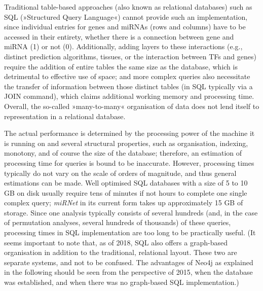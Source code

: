 Traditional table-based approaches (also known as relational databases) such as SQL  (»Structured Query Language«) cannot provide such an implementation, since individual entries for genes and miRNAs (rows and columns) have to be accessed in their entirety, whether there is a connection between gene and miRNA (1) or not (0). Additionally, adding layers to these interactions (e.g., distinct prediction algorithms, tissues, or the interaction between TFs and genes) require the addition of entire tables the same size as the database, which is detrimental to effective use of space; and more complex queries also necessitate the transfer of information between those distinct tables (in SQL typically via a JOIN command), which claims additional working memory and processing time. Overall, the so-called »many-to-many« organisation of data does not lend itself to representation in a relational database. 


The actual performance is determined by the processing power of the machine it is running on and several structural properties, such as organisation, indexing, monotony, and of course the size of the database; therefore, an estimation of processing time for queries is bound to be inaccurate. However, processing times typically do not vary on the scale of orders of magnitude, and thus general estimations can be made. Well optimised SQL databases with a size of 5 to 10 GB on disk usually require tens of minutes if not hours to complete one single complex query\cite{Chaudhuri2004}; \textit{miRNet} in its current form takes up approximately 15 GB of storage. Since one analysis typically consists of several hundreds (and, in the case of permutation analyses, several hundreds of thousands) of these queries, processing times in SQL implementation are too long to be practically useful. (It seems important to note that, as of 2018, SQL also offers a graph-based organisation in addition to the traditional, relational layout. These two are separate systems, and not to be confused. The advantages of Neo4j as explained in the following should be seen from the perspective of 2015, when the database was established, and when there was no graph-based SQL implementation.)

